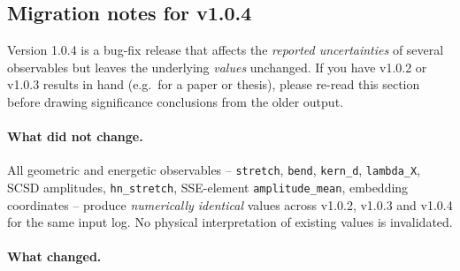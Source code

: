 \documentclass[11pt,a4paper,twoside]{article}
\theoremstyle{remark}
\begin{document}
\subsection{Migration notes for v1.0.4}
\label{sec:migration-v104}

Version 1.0.4 is a bug-fix release that affects the
\emph{reported uncertainties} of several observables but leaves
the underlying \emph{values} unchanged. If you have v1.0.2 or v1.0.3
results in hand (e.g.\ for a paper or thesis), please re-read this
section before drawing significance conclusions from the older
output.

\paragraph{What did not change.} All geometric and energetic
observables -- \texttt{stretch}, \texttt{bend}, \texttt{kern\_d},
\texttt{lambda\_X}, SCSD amplitudes, \texttt{hn\_stretch},
SSE-element \texttt{amplitude\_mean}, embedding coordinates --
produce \emph{numerically identical} values across v1.0.2, v1.0.3
and v1.0.4 for the same input log. No physical interpretation of
existing values is invalidated.

\paragraph{What changed.}
\end{document}
